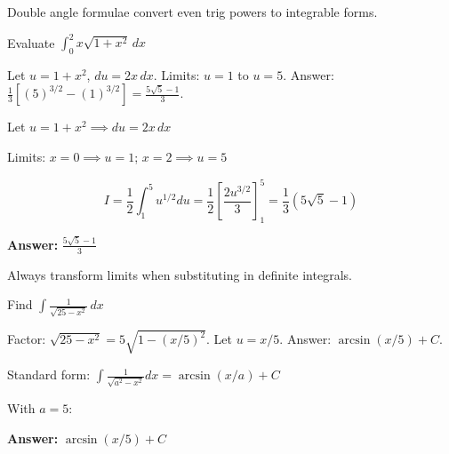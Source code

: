 \begin{takeaways}
Double angle formulae convert even trig powers to integrable forms.
\end{takeaways}

\vspace{1cm}

\begin{problem}
Evaluate $\displaystyle \int_0^2 x\sqrt{1 + x^2} \, dx$
\end{problem}

\begin{hint}
Let $u = 1 + x^2$, $du = 2x \, dx$. Limits: $u=1$ to $u=5$. Answer: $\frac{1}{3}[(5)^{3/2} - (1)^{3/2}] = \frac{5\sqrt{5}-1}{3}$.
\end{hint}

\begin{solution}
Let $u = 1+x^2 \implies du = 2x\,dx$

Limits: $x=0 \implies u=1$; $x=2 \implies u=5$

\[
I = \frac{1}{2}\int_1^5 u^{1/2}du = \frac{1}{2}\left[\frac{2u^{3/2}}{3}\right]_1^5 = \frac{1}{3}(5\sqrt{5} - 1)
\]

\textbf{Answer:} $\boxed{\frac{5\sqrt{5}-1}{3}}$
\end{solution}

\begin{takeaways}
Always transform limits when substituting in definite integrals.
\end{takeaways}

\vspace{1cm}

\begin{problem}
Find $\displaystyle \int \frac{1}{\sqrt{25 - x^2}} \, dx$
\end{problem}

\begin{hint}
Factor: $\sqrt{25 - x^2} = 5\sqrt{1 - (x/5)^2}$. Let $u = x/5$. Answer: $\arcsin(x/5) + C$.
\end{hint}

\begin{solution}
Standard form: $\displaystyle \int \frac{1}{\sqrt{a^2-x^2}}dx = \arcsin(x/a) + C$

With $a=5$:

\textbf{Answer:} $\boxed{\arcsin(x/5) + C}$
\end{solution}

